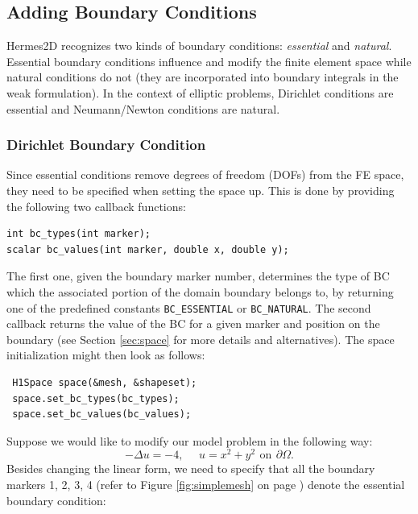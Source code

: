 
\subsection{Adding Boundary Conditions}
\label{sec:bc}

Hermes2D recognizes two kinds of boundary conditions: {\em essential} and {\em natural}. 
Essential boundary conditions influence and modify the finite element space while natural
conditions do not (they are incorporated into boundary integrals in the weak formulation).
In the context of elliptic problems, Dirichlet conditions are essential and Neumann/Newton
conditions are natural.


\subsubsection{Dirichlet Boundary Condition}

Since essential conditions remove degrees of freedom (DOFs) from the FE space, they need to be
specified when setting the space up. This is done by providing the following two callback functions:

\begin{lstlisting}
int bc_types(int marker);
scalar bc_values(int marker, double x, double y);
\end{lstlisting}

The first one, given the boundary marker number, determines the type of BC which the associated
portion of the domain boundary belongs to, by returning one of the predefined constants \verb"BC_ESSENTIAL"
or \verb"BC_NATURAL". The second callback returns the value of the BC for a given marker and
position on the boundary (see Section \ref{sec:space} for more details and alternatives). The space
initialization might then look as follows:

\begin{lstlisting}
 H1Space space(&mesh, &shapeset);
 space.set_bc_types(bc_types);
 space.set_bc_values(bc_values);
\end{lstlisting}

Suppose we would like to modify our model problem in the following way:
$$-\Delta u = -4,\ \ \ \ \ \ u = x^2 + y^2\,\ \mbox{on}\,\ \partial \Omega.$$
Besides changing the linear form, we need to specify that all the boundary markers 1, 2, 3, 4
(refer to Figure \ref{fig:simplemesh} on page \pageref{fig:simplemesh}) denote the essential
boundary condition:


